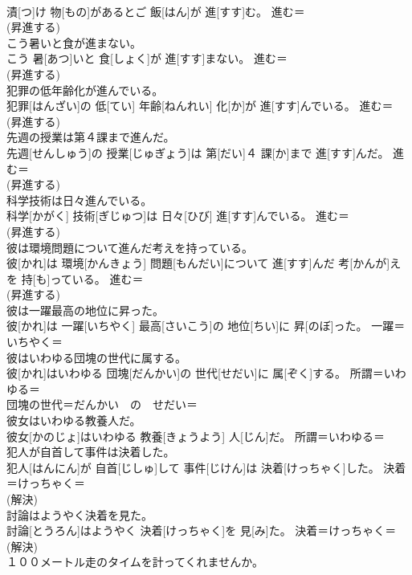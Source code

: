 \documentclass[8pt]{extreport}
\begin{document}
\begin{CJK}{UTF8}{min}
{\\	漬[つ]け 物[もの]があるとご 飯[はん]が 進[すす]む。	進む＝ 
\\	(昇進する) 
\\	こう暑いと食が進まない。	
\\	こう 暑[あつ]いと 食[しょく]が 進[すす]まない。	進む＝ 
\\	(昇進する) 
\\	犯罪の低年齢化が進んでいる。	
\\	犯罪[はんざい]の 低[てい] 年齢[ねんれい] 化[か]が 進[すす]んでいる。	進む＝ 
\\	(昇進する) 
\\	先週の授業は第４課まで進んだ。	
\\	先週[せんしゅう]の 授業[じゅぎょう]は 第[だい]４ 課[か]まで 進[すす]んだ。	進む＝ 
\\	(昇進する) 
\\	科学技術は日々進んでいる。	
\\	科学[かがく] 技術[ぎじゅつ]は 日々[ひび] 進[すす]んでいる。	進む＝ 
\\	(昇進する) 
\\	彼は環境問題について進んだ考えを持っている。	
\\	彼[かれ]は 環境[かんきょう] 問題[もんだい]について 進[すす]んだ 考[かんが]えを 持[も]っている。	進む＝ 
\\	(昇進する) 
\\	彼は一躍最高の地位に昇った。	
\\	彼[かれ]は 一躍[いちやく] 最高[さいこう]の 地位[ちい]に 昇[のぼ]った。	一躍＝いちやく＝ 
\\	彼はいわゆる団塊の世代に属する。	
\\	彼[かれ]はいわゆる 団塊[だんかい]の 世代[せだい]に 属[ぞく]する。	所謂＝いわゆる＝ 
\\	団塊の世代＝だんかい　の　せだい＝ 
\\	彼女はいわゆる教養人だ。	
\\	彼女[かのじょ]はいわゆる 教養[きょうよう] 人[じん]だ。	所謂＝いわゆる＝ 
\\	犯人が自首して事件は決着した。	
\\	犯人[はんにん]が 自首[じしゅ]して 事件[じけん]は 決着[けっちゃく]した。	決着＝けっちゃく＝ 
\\	(解決) 
\\	討論はようやく決着を見た。	
\\	討論[とうろん]はようやく 決着[けっちゃく]を 見[み]た。	決着＝けっちゃく＝ 
\\	(解決) 
\\	１００メートル走のタイムを計ってくれませんか。	
}
\end{CJK}
\end{document}
